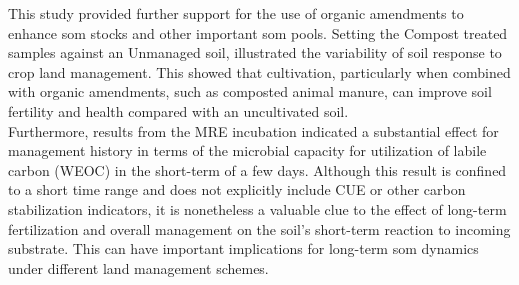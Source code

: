 	This study provided further support for the use of organic amendments to enhance \gls{som} stocks and other important \gls{som} pools. Setting the Compost treated samples against an Unmanaged soil, illustrated the variability of soil response to crop land management. This showed that cultivation, particularly when combined with organic amendments, such as composted animal manure, can improve soil fertility and health compared with an uncultivated soil.\\
	Furthermore, results from the MRE incubation indicated a substantial effect for management history in terms of the microbial capacity for utilization of labile carbon (WEOC) in the short-term of a few days. Although this result is confined to a short time range and does not explicitly include CUE or other carbon stabilization indicators, it is nonetheless a valuable clue to the effect of long-term fertilization and overall management on the soil's short-term reaction to incoming substrate. This can have important implications for long-term \gls{som} dynamics under different land management schemes.  
	         
	
	
     

